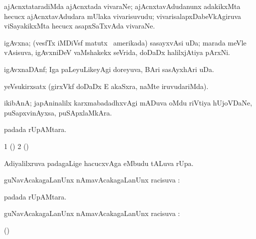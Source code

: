 \bentry
{}
\gl{\nA}
\expl{\Latin}
\bmng
ajAcnxtataradiMda ajAcnxtada vivaraNe; ajAcnxtavAdudanunx adakikxMta hecucx ajAcnxtavAdudara mUlaka vivarisuvudu; vivarisalapxDabeVkAgiruva viSayakikxMta hecucx asapxSaTxvAda vivaraNe. 
\emng
\eentry

\bentry
{}
\gl{\nA}
\bmng
igAvxna; (vesfTx iMDiVsf matutx \da\ amerikada) sasayxvAsi uDa; marada meVle vAsisuva, igAvxniDeV vaMshakekx seVrida, doDaDx halilxjAtiya pArxNi.   
\emng
\eentry

\bentry
{}
\gl{\nA}
\bmng
igAvxnaDAnf; Iga paLeyuLikeyAgi doreyuva, BAri sasAyxhAri uDa. 
\emng
\eentry

\bentry
{}
\gl{\saMkiSx}
\bmng
{} 
\emng
\eentry

\bentry
{}
\gl{\saMkiSx}
\bmng
yeVsukirxsatx (girxVkf doDaDx E \eng{$(\sum)$} akaSxra, naMte iruvudariMda). 
\emng
\eentry

\bentry
{}
\gl{\nA}
\bmng
ikibAnA; japAninalilx karxmabadadhxvAgi mADuva oMdu riVtiya hUjoVDaNe, puSapxvinAyxsa, puSApxlaMkAra. 
\emng
\eentry

\bentry
{}
\gl{\nA}
\bmng
{} padada rUpAMtara. 
\emng
\eentry

\bentry
{}
\gl{\saMkiSx}
\bmng
\bnum
\num{1} (\ame)  
\num{2} (\birx)  
\enum
\emng
\eentry

\bentry
{}
\gl{\pUparx}
\bmng
{} Adiyalilxruva padagaLige hacucxvAga  eMbudu tALuva rUpa. 
\emng
\eentry

\bentry
{}
\gl{\uparx}
\bmng
guNavAcakagaLanUnx nAmavAcakagaLanUnx racisuva \uparx:  
\emng
\eentry

\bentry
{}
\gl{\nA}
\bmng
{} padada rUpAMtara. 
\emng
\eentry

\bentry
{}
\gl{\uparx}
\bmng
guNavAcakagaLanUnx nAmavAcakagaLanUnx racisuva \uparx:  
\emng
\eentry

\bentry
{}
\gl{\saMkiSx}
\bmng
(\birx)  
\emng
\eentry

